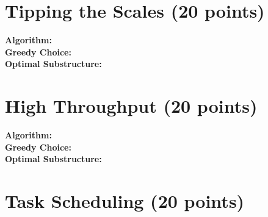 \documentclass{article}[12pt]
\begin{document}
\newpage
\section{Tipping the Scales (20 points)}
\noindent\textbf{Algorithm:} \\
\noindent\textbf{Greedy Choice:} \\
\noindent\textbf{Optimal Substructure:} \\

\newpage
\section{High Throughput (20 points)}
\noindent\textbf{Algorithm:} \\
\noindent\textbf{Greedy Choice:} \\
\noindent\textbf{Optimal Substructure:} \\

\newpage
\section{Task Scheduling (20 points)}
\end{document}
